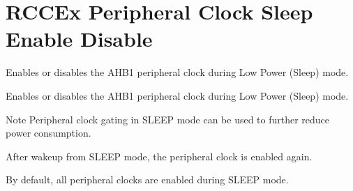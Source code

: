 \hypertarget{group___r_c_c_ex___peripheral___clock___sleep___enable___disable}{\section{R\-C\-C\-Ex Peripheral Clock Sleep Enable Disable}
\label{group___r_c_c_ex___peripheral___clock___sleep___enable___disable}
}


Enables or disables the A\-H\-B1 peripheral clock during Low Power (Sleep) mode.  


Enables or disables the A\-H\-B1 peripheral clock during Low Power (Sleep) mode. \begin{DoxyNote}{Note}
Peripheral clock gating in S\-L\-E\-E\-P mode can be used to further reduce power consumption. 

After wakeup from S\-L\-E\-E\-P mode, the peripheral clock is enabled again. 

By default, all peripheral clocks are enabled during S\-L\-E\-E\-P mode. 
\end{DoxyNote}
